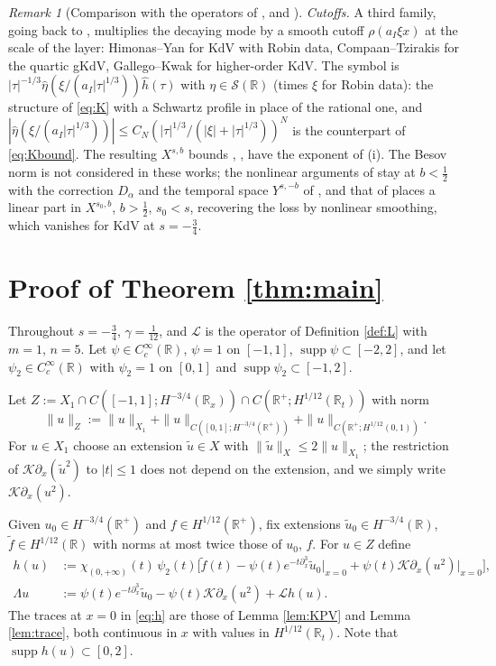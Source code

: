 \documentclass[10pt,reqno]{amsart}
\theoremstyle{remark}
\newtheorem{remark}[theorem]{Remark}
\numberwithin{equation}{section}
\newcommand{\R}{\mathbb R}
\newcommand{\pd}{\partial}
\newcommand{\ga}{\gamma}
\newcommand{\supp}{\operatorname{supp}}
\newcommand{\Lc}{\mathcal{L}}
\newcommand{\Kc}{\mathcal{K}}
\begin{document}
\begin{remark}[Comparison with the operators of \cite{CK,Holmer}, \cite{BSZ2} and \cite{ET,HY,CT,GK}]
\emph{Cutoffs.} A third family, going back to \cite{ET}, multiplies the decaying mode by a smooth cutoff $\rho(a_I\xi x)$ at the scale of the layer: Himonas--Yan \cite{HY} for KdV with Robin data, Compaan--Tzirakis \cite{CT} for the quartic gKdV, Gallego--Kwak \cite{GK} for higher-order KdV. The symbol is $|\tau|^{-1/3}\widehat\eta(\xi/(a_I|\tau|^{1/3}))\widehat h(\tau)$ with $\eta\in\mathcal S(\R)$ (times $\xi$ for Robin data): the structure of \eqref{eq:K} with a Schwartz profile in place of the rational one, and $|\widehat\eta(\xi/(a_I|\tau|^{1/3}))|\le C_N(|\tau|^{1/3}/(|\xi|+|\tau|^{1/3}))^N$ \cite[Lemma 2.2]{HY} is the counterpart of \eqref{eq:Kbound}. The resulting $X^{s,b}$ bounds \cite[Lemma 2.3]{HY}, \cite[Lemma 3.6]{CT}, \cite[Lemma 4.3]{GK} have the exponent of (i). The Besov norm is not considered in these works; the nonlinear arguments of \cite{HY,GK} stay at $b<\frac12$ with the correction $D_\alpha$ and the temporal space $Y^{s,-b}$ of \cite{Holmer}, and that of \cite{CT} places a linear part in $X^{s_0,b}$, $b>\frac12$, $s_0<s$, recovering the loss by nonlinear smoothing, which vanishes for KdV at $s=-\frac34$.


\end{remark}


\section{Proof of Theorem \ref{thm:main}}\label{sec:proof}

Throughout $s=-\frac34$, $\ga=\frac1{12}$, and $\Lc$ is the operator of Definition \ref{def:L} with $m=1$, $n=5$. Let $\psi\in C_c^\infty(\R)$, $\psi=1$ on $[-1,1]$, $\supp\psi\subset[-2,2]$, and let $\psi_2\in C^\infty_c(\R)$ with $\psi_2=1$ on $[0,1]$ and $\supp\psi_2\subset[-1,2]$.


Let $Z:=X_1\cap C([-1,1];H^{-3/4}(\R_x))\cap C(\R^+;H^{1/12}(\R_t))$ with norm $$\|u\|_Z:=\|u\|_{X_1}+\|u\|_{C([0,1];H^{-3/4}(\R^+))}+\|u\|_{C(\R^+;H^{1/12}(0,1))}.$$ For $u\in X_1$ choose an extension $\tilde u\in X$ with $\|\tilde u\|_X\le2\|u\|_{X_1}$; the restriction of $\Kc\pd_x(\tilde u^2)$ to $|t|\le1$ does not depend on the extension, and we simply write $\Kc\pd_x(u^2)$.

Given $u_0\in H^{-3/4}(\R^+)$ and $f\in H^{1/12}(\R^+)$, fix extensions $\tilde u_0\in H^{-3/4}(\R)$, $\tilde f\in H^{1/12}(\R)$ with norms at most twice those of $u_0$, $f$. For $u\in Z$ define
\begin{align}
h(u)&:=\chi_{(0,+\infty)}(t)\,\psi_2(t)\Big[\tilde f(t)-\psi(t)e^{-t\pd_x^3}\tilde u_0\big|_{x=0}+\psi(t)\Kc\pd_x(u^2)\big|_{x=0}\Big],\label{eq:h}\\
\Lambda u&:=\psi(t)e^{-t\pd_x^3}\tilde u_0-\psi(t)\Kc\pd_x(u^2)+\Lc h(u).\label{eq:Lambda}
\end{align}
The traces at $x=0$ in \eqref{eq:h} are those of Lemma \ref{lem:KPV} and Lemma \ref{lem:trace}, both continuous in $x$ with values in $H^{1/12}(\R_t)$. Note that $\supp h(u)\subset[0,2]$.
\end{document}
